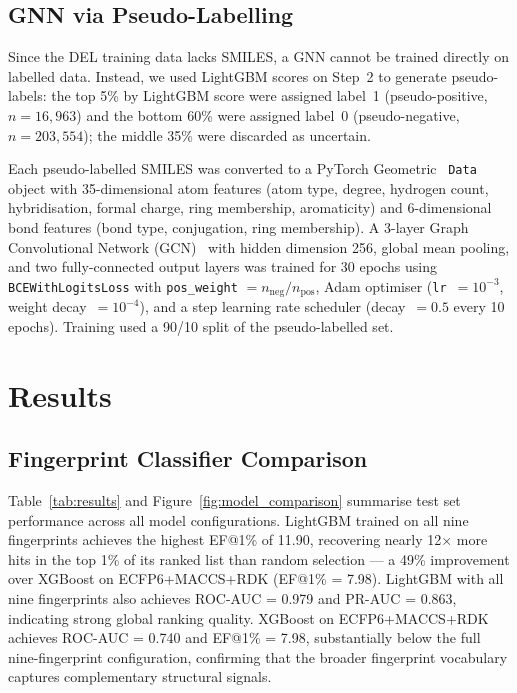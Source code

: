 \documentclass[10pt, letterpaper]{article}
\begin{document}
\subsection{GNN via Pseudo-Labelling}
Since the DEL training data lacks SMILES, a GNN cannot be trained directly on labelled data. Instead, we used LightGBM scores on Step~2 to generate pseudo-labels: the top 5\% by LightGBM score were assigned label~1 (pseudo-positive, $n = 16{,}963$) and the bottom 60\% were assigned label~0 (pseudo-negative, $n = 203{,}554$); the middle 35\% were discarded as uncertain.

Each pseudo-labelled SMILES was converted to a PyTorch Geometric~\cite{Fey2019} \texttt{Data} object with 35-dimensional atom features (atom type, degree, hydrogen count, hybridisation, formal charge, ring membership, aromaticity) and 6-dimensional bond features (bond type, conjugation, ring membership). A 3-layer Graph Convolutional Network (GCN)~\cite{Kipf2017} with hidden dimension 256, global mean pooling, and two fully-connected output layers was trained for 30 epochs using \texttt{BCEWithLogitsLoss} with \texttt{pos\_weight} $= n_{\text{neg}} / n_{\text{pos}}$, Adam optimiser (\texttt{lr}~$= 10^{-3}$, weight decay~$= 10^{-4}$), and a step learning rate scheduler (decay~$= 0.5$ every 10 epochs). Training used a 90/10 split of the pseudo-labelled set.

\section{Results}

\subsection{Fingerprint Classifier Comparison}
Table~\ref{tab:results} and Figure~\ref{fig:model_comparison} summarise test set performance across all model configurations. LightGBM trained on all nine fingerprints achieves the highest EF@1\% of 11.90, recovering nearly 12$\times$ more hits in the top 1\% of its ranked list than random selection — a 49\% improvement over XGBoost on ECFP6+MACCS+RDK (EF@1\% = 7.98). LightGBM with all nine fingerprints also achieves ROC-AUC = 0.979 and PR-AUC = 0.863, indicating strong global ranking quality. XGBoost on ECFP6+MACCS+RDK achieves ROC-AUC = 0.740 and EF@1\% = 7.98, substantially below the full nine-fingerprint configuration, confirming that the broader fingerprint vocabulary captures complementary structural signals.
\end{document}
